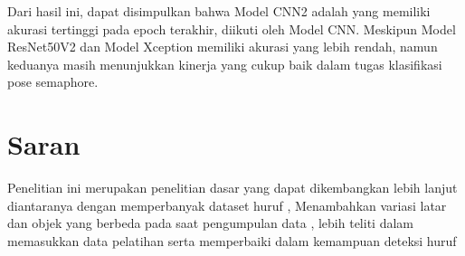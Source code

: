 Dari hasil ini, dapat disimpulkan bahwa Model CNN2 adalah yang memiliki akurasi tertinggi pada epoch terakhir, diikuti oleh Model CNN. Meskipun Model ResNet50V2 dan Model Xception memiliki akurasi yang lebih rendah, namun keduanya masih menunjukkan kinerja yang cukup baik dalam tugas klasifikasi pose semaphore.

\section{Saran}
Penelitian ini merupakan penelitian dasar yang dapat dikembangkan lebih lanjut diantaranya dengan  memperbanyak dataset huruf ,	Menambahkan variasi latar dan objek yang berbeda pada saat pengumpulan data , lebih teliti dalam memasukkan data pelatihan serta memperbaiki dalam kemampuan deteksi huruf